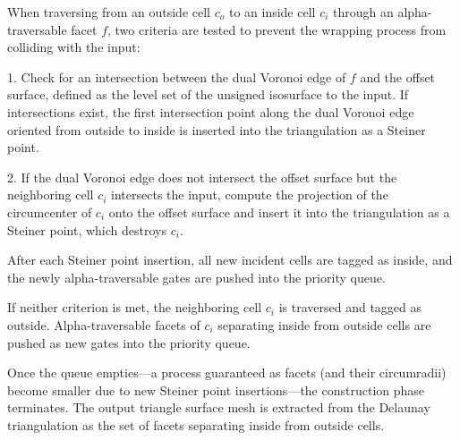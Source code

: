 \documentclass[12pt]{article}
\begin{document}
When traversing from an outside cell \( c_o \) to an inside cell \( c_i \) through an
alpha-traversable facet \( f \), two criteria are tested to prevent the wrapping process
from colliding with the input:

1. Check for an intersection between the dual Voronoi edge of \( f \) and the offset
surface, defined as the level set of the unsigned isosurface to the input. If intersections
exist, the first intersection point along the dual Voronoi edge oriented from outside to
inside is inserted into the triangulation as a Steiner point.

2. If the dual Voronoi edge does not intersect the offset surface but the neighboring cell
\( c_i \) intersects the input, compute the projection of the circumcenter of \( c_i \)
onto the offset surface and insert it into the triangulation as a Steiner point, which
destroys \( c_i \).

After each Steiner point insertion, all new incident cells are tagged as inside, and the
newly alpha-traversable gates are pushed into the priority queue.

If neither criterion is met, the neighboring cell \( c_i \) is traversed and tagged as
outside. Alpha-traversable facets of \( c_i \) separating inside from outside cells are
pushed as new gates into the priority queue.

Once the queue empties—a process guaranteed as facets (and their circumradii) become
smaller due to new Steiner point insertions—the construction phase terminates. The output
triangle surface mesh is extracted from the Delaunay triangulation as the set of facets
separating inside from outside cells.
\end{document}

